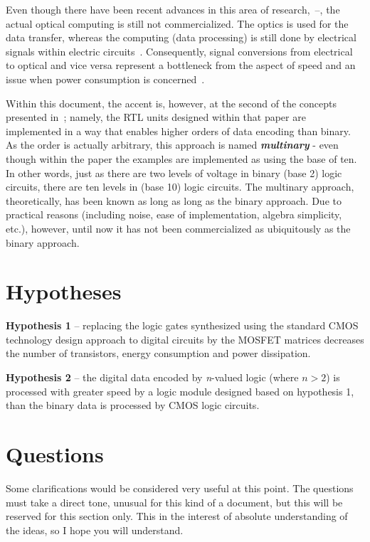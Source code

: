 \documentclass[12pt]{article}
\begin{document}
Even though there have been recent advances in this area of research,~\cite{Piggott:2015}--\cite{Jain:2017}, the actual optical computing is still not commercialized. The optics is  used for the data transfer, whereas the computing (data processing) is still done by electrical signals within electric circuits~\cite{Intel:2016}. Consequently, signal conversions from electrical to optical and vice versa represent a bottleneck from the aspect of speed and an issue when power consumption is concerned~\cite{Piggott:2015}.

Within this document, the accent is, however, at the second of the concepts presented in~\cite{Arago:2012}; namely, the RTL units designed within that paper are implemented in a way that enables higher orders of data encoding than binary. As the order is actually arbitrary, this approach is named \textbf{\textit{multinary}} - even though within the paper the examples are implemented as using the base of ten. In other words, just as there are two levels of voltage in binary (base 2) logic circuits, there are ten levels in (base 10) logic circuits. The multinary approach, theoretically, has been known as long as  long as the binary approach. Due to practical reasons (including noise, ease of implementation, algebra simplicity, etc.), however, until now it has not been commercialized as ubiquitously as the binary approach.

\section{Hypotheses}
\label{hypo}

\noindent \textbf{Hypothesis 1} -- replacing the logic gates synthesized using the standard CMOS technology design approach to digital circuits by the MOSFET matrices decreases the number of transistors, energy consumption and power dissipation.

\smallskip

\noindent \textbf{Hypothesis 2} -- the digital data encoded by \textit{n}-valued logic (where $n>2$) is processed with greater speed by a logic module designed based on hypothesis 1, than the binary data is processed by CMOS logic circuits.


\section{Questions}
\label{qs}

Some clarifications would be considered very useful at this point. The questions must take a direct tone, unusual for this kind of a document, but this will be reserved for this section only. This in the interest of absolute understanding of the ideas, so I hope you will understand.
\end{document}
